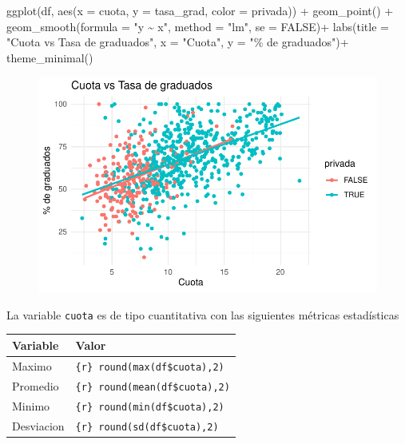 \documentclass[
  letterpaper,
  DIV=11,
  numbers=noendperiod]{scrartcl}
\newenvironment{Shaded}{\begin{snugshade}}{\end{snugshade}}
\newcommand{\AttributeTok}[1]{\textcolor[rgb]{0.40,0.45,0.13}{#1}}
\newcommand{\ConstantTok}[1]{\textcolor[rgb]{0.56,0.35,0.01}{#1}}
\newcommand{\FunctionTok}[1]{\textcolor[rgb]{0.28,0.35,0.67}{#1}}
\newcommand{\NormalTok}[1]{\textcolor[rgb]{0.00,0.23,0.31}{#1}}
\newcommand{\SpecialCharTok}[1]{\textcolor[rgb]{0.37,0.37,0.37}{#1}}
\newcommand{\StringTok}[1]{\textcolor[rgb]{0.13,0.47,0.30}{#1}}
\begin{document}
\begin{Shaded}
\begin{Highlighting}[]
\FunctionTok{ggplot}\NormalTok{(df, }\FunctionTok{aes}\NormalTok{(}\AttributeTok{x =}\NormalTok{ cuota, }\AttributeTok{y =}\NormalTok{ tasa\_grad, }\AttributeTok{color =}\NormalTok{ privada)) }\SpecialCharTok{+}
  \FunctionTok{geom\_point}\NormalTok{() }\SpecialCharTok{+} 
  \FunctionTok{geom\_smooth}\NormalTok{(}\AttributeTok{formula =} \StringTok{"y \textasciitilde{} x"}\NormalTok{, }\AttributeTok{method =} \StringTok{"lm"}\NormalTok{, }\AttributeTok{se =} \ConstantTok{FALSE}\NormalTok{)}\SpecialCharTok{+}
  \FunctionTok{labs}\NormalTok{(}\AttributeTok{title =} \StringTok{"Cuota vs Tasa de graduados"}\NormalTok{,}
       \AttributeTok{x =} \StringTok{"Cuota"}\NormalTok{,}
       \AttributeTok{y =} \StringTok{"\% de graduados"}\NormalTok{)}\SpecialCharTok{+}
  \FunctionTok{theme\_minimal}\NormalTok{()}
\end{Highlighting}
\end{Shaded}

\begin{figure}[H]

{\centering \includegraphics{TP_final_files/figure-pdf/unnamed-chunk-8-1.pdf}

}

\end{figure}

La variable \texttt{cuota} es de tipo cuantitativa con las siguientes
métricas estadísticas

\begin{longtable}[]{@{}ll@{}}
\toprule\noalign{}
Variable & Valor \\
\midrule\noalign{}
\endhead
\bottomrule\noalign{}
\endlastfoot
Maximo & \texttt{\{r\}\ round(max(df\$cuota),2)} \\
Promedio & \texttt{\{r\}\ round(mean(df\$cuota),2)} \\
Minimo & \texttt{\{r\}\ round(min(df\$cuota),2)} \\
Desviacion & \texttt{\{r\}\ round(sd(df\$cuota),2)} \\
\end{longtable}
\end{document}
